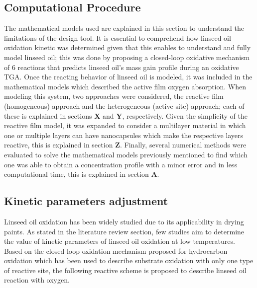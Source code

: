 \begin{refsection}
\section[Comp.Procedure]{Computational Procedure}
The mathematical models used are explained in this section to understand the limitations of the design tool. It is essential to comprehend how linseed oil oxidation kinetic was determined given that this enables to understand and fully model linseed oil; this was done by proposing a closed-loop oxidative mechanism of 6 reactions that predicts linseed oil's mass gain profile during an oxidative TGA. Once the reacting behavior of linseed oil is modeled, it was included in the mathematical models which described the active film oxygen absorption. When modeling this system, two approaches were considered, the reactive film (homogeneous) approach and the heterogeneous (active site) approach; each of these is explained in sections \textbf{X} and \textbf{Y}, respectively. Given the simplicity of the reactive film model, it was expanded to consider a multilayer material in which one or multiple layers can have nanocapsules which make the respective layers reactive, this is explained in section \textbf{Z}. Finally,  several numerical methods were evaluated to solve the mathematical models previously mentioned to find which one was able to obtain a concentration profile with a minor error and in less computational time, this is explained in section \textbf{A}. 


\subsection{Kinetic parameters adjustment}\label{subsec:met_cinetica}
Linseed oil oxidation has been widely studied due to its applicability in drying paints. As stated in the literature review section, few studies aim to determine the value of kinetic parameters of linseed oil oxidation at low temperatures. Based on the closed-loop oxidation mechanism proposed for hydrocarbon oxidation which has been used to describe substrate oxidation with only one type of reactive site, the following reactive scheme is proposed to describe linseed oil reaction with oxygen.


\end{refsection}
